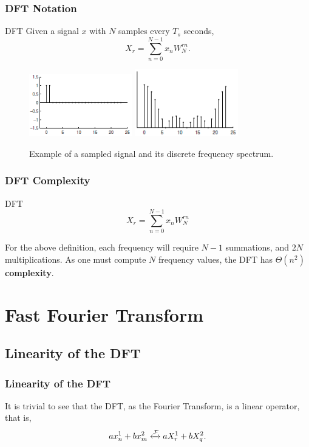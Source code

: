 \documentclass{beamer}
\begin{document}
\begin{frame}
    \frametitle{DFT Notation}
    \begin{exampleblock}{DFT}
        Given a signal $x$ with $N$ samples every $T_s$ seconds, \[
        X_r = \sum_{n=0}^{N-1} x_{n} W_N^{r n}
        .\]
    \end{exampleblock}
    \begin{figure}
        \centering
        \includegraphics[width=0.4\textwidth]{dft_a.png}
        \includegraphics[width=0.4\textwidth]{dft_b.png}
        \caption{Example of a sampled signal and its discrete frequency spectrum.}
        \label{fig:dft_b-png}
    \end{figure}
\end{frame}

\begin{frame}
    \frametitle{DFT Complexity}
    \begin{exampleblock}{DFT}
        \[
        X_r = \sum_{n=0}^{N-1} x_{n} W_N^{r n}
        \]
    \end{exampleblock}
    For the above definition, each frequency will require $N-1$ summations, and $2N$ multiplications. As one must compute $N$ frequency values, the DFT has \textbf{$\Theta\left( n^2 \right) $ complexity}.
\end{frame}

\section{Fast Fourier Transform}

\subsection{Linearity of the DFT}

\begin{frame}
    \frametitle{Linearity of the DFT}
    It is trivial to see that the DFT, as the Fourier Transform, is a linear operator, that is, \[
	a x_{n}^1 + bx_{m}^2 \xleftrightarrow{\mathcal{F}} aX_r^1 + bX_q^2
    .\] 
\end{frame}
\end{document}
